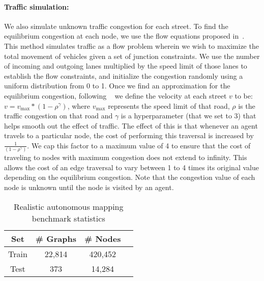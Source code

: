 \paragraph{Traffic simulation:}
We also simulate unknown traffic congestion for each street. To find the equilibrium
congestion at each node, we use the flow equations proposed in~\citet{macroscopicsim}. This
method simulates traffic as a flow problem wherein we wish to maximize the total movement of
vehicles given a set of junction constraints. We use the number of incoming and outgoing lanes
multiplied by the speed limit of those lanes to establish the flow constraints, and initialize
the congestion randomly using a uniform distribution from 0 to 1. Once we find an approximation
for the equilibrium congestion, following ~\citet{continuum} we define the velocity at each
street $v$ to be:
$v = v_{\max} * (1 - \rho ^ {\gamma})$,
where $v_{\max}$ represents the speed limit of that road, $\rho$ is the traffic congestion on that
road and $\gamma$ is a hyperparameter (that we set to 3) that helps smooth out the effect of traffic.
The effect of this is that whenever an agent travels to a particular node, the cost of performing
this traversal is increased by $\frac{1}{(1 - \rho ^ {\gamma})}$.
We cap this factor to a maximum
value of 4 to ensure that the cost of traveling to nodes with maximum congestion does not extend to
infinity. This allows the cost of an edge traversal to vary between 1 to 4 times its
original value depending on the equilibrium congestion. Note that the congestion value of each node
is unknown until the node is visited by an agent.

\begin{table}[t]
\begin{small}
\begin{center}
\begin{tabular}{cccc}
\toprule
Set     & \# Graphs & \# Nodes    \\
\midrule
Train  & 22,814    & 420,452  \\
Test   & 373       & 14,284      \\
\bottomrule
\end{tabular}
\end{center}
\end{small}
\vspace{-0.1in}
\caption{Realistic autonomous mapping benchmark statistics}
\label{tab:stats}
\vspace{-0.2in}
\end{table}
